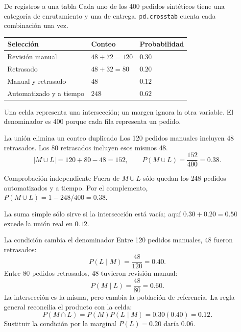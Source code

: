 \documentclass[aspectratio=169,10pt,spanish]{beamer}
\begin{document}
\begin{frame}{De registros a una tabla}
  \small
  Cada uno de los 400 pedidos sintéticos tiene una categoría de enrutamiento
  y una de entrega. \texttt{pd.crosstab} cuenta cada combinación una vez.
  \begin{center}
    \begin{tabular}{lll}
      \toprule
      Selección & Conteo & Probabilidad\\
      \midrule
      Revisión manual & \(48+72=120\) & \(0.30\)\\
      Retrasado & \(48+32=80\) & \(0.20\)\\
      Manual y retrasado & \(48\) & \(0.12\)\\
      Automatizado y a tiempo & \(248\) & \(0.62\)\\
      \bottomrule
    \end{tabular}
  \end{center}
  Una celda representa una intersección; un margen ignora la otra variable.
  El denominador es 400 porque cada fila representa un pedido.
\end{frame}

\begin{frame}{La unión elimina un conteo duplicado}
  \small
  Los 120 pedidos manuales incluyen 48 retrasados. Los 80 retrasados
  incluyen esos mismos 48.
  \[
    |M\cup L|=120+80-48=152,\qquad
    P(M\cup L)=\frac{152}{400}=0.38.
  \]
  \begin{block}{Comprobación independiente}
    Fuera de \(M\cup L\) sólo quedan los 248 pedidos automatizados y a tiempo.
    Por el complemento, \(P(M\cup L)=1-248/400=0.38\).
  \end{block}
  La suma simple sólo sirve si la intersección está vacía; aquí
  \(0.30+0.20=0.50\) excede la unión real en \(0.12\).
\end{frame}

\begin{frame}{La condición cambia el denominador}
  \small
  Entre 120 pedidos manuales, 48 fueron retrasados:
  \[
    P(L\mid M)=\frac{48}{120}=0.40.
  \]
  Entre 80 pedidos retrasados, 48 tuvieron revisión manual:
  \[
    P(M\mid L)=\frac{48}{80}=0.60.
  \]
  La intersección es la misma, pero cambia la población de referencia.
  La regla general reconcilia el producto con la celda:
  \[
    P(M\cap L)=P(M)P(L\mid M)=0.30(0.40)=0.12.
  \]
  Sustituir la condición por la marginal \(P(L)=0.20\) daría \(0.06\).
\end{frame}
\end{document}
